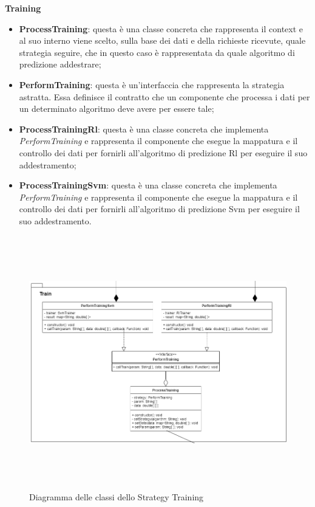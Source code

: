 			\textbf{Training} \mbox{} \\ 
			\begin{itemize}
				\item \textbf{ProcessTraining}: questa è una classe concreta che rappresenta il context e al suo interno viene scelto, sulla base dei dati e della richieste ricevute, quale strategia seguire, che in questo caso è rappresentata da quale algoritmo di predizione addestrare;
				\item \textbf{PerformTraining}: questa è un'interfaccia che rappresenta la strategia astratta. Essa definisce il contratto che un componente che processa i dati per un determinato algoritmo deve avere per essere tale;
				\item \textbf{ProcessTrainingRl}: questa è una classe concreta che implementa \textit{PerformTraining} e rappresenta il componente che esegue la mappatura e il controllo dei dati per fornirli all'algoritmo di predizione Rl per eseguire il suo addestramento;
				\item \textbf{ProcessTrainingSvm}: questa è una classe concreta che implementa \textit{PerformTraining} e rappresenta il componente che esegue la mappatura e il controllo dei dati per fornirli all'algoritmo di predizione Svm per eseguire il suo addestramento.
			\end{itemize}
		\mbox{}			
			\begin{landscape}
			\begin{figure} [H]
				\begin{center}
					\includegraphics[width=350mm,height=110mm,keepaspectratio]{./img/Diagrammi/dAppT.png}
					\caption{Diagramma delle classi dello Strategy Training}
				\end{center}
			\end{figure}
			\end{landscape}
